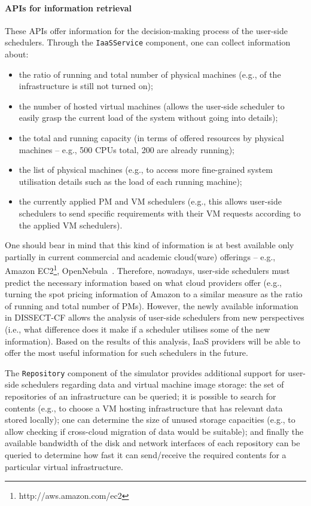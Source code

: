 \documentclass[sort, compress, 5p]{elsarticle}
\begin{document}
\paragraph{APIs for information retrieval} These APIs offer information for the decision-making process of the user-side schedulers. Through the \verb+IaaSService+ component, one can collect information about:
\begin{itemize}
\item the ratio of running and total number of physical machines (e.g.,  of the infrastructure is still not turned on);
\item the number of hosted virtual machines (allows the user-side scheduler to easily grasp the current load of the system without going into details);
\item the total and running capacity (in terms of offered resources by physical machines -- e.g.,  500 CPUs total, 200 are already running);
\item the list of physical machines (e.g., to access more fine-grained system utilisation details such as the load of each running machine);
\item the currently applied PM and VM schedulers (e.g., this allows user-side schedulers to send specific requirements with their VM requests according to the applied VM schedulers).
\end{itemize}
One should bear in mind that this kind of information is at best available only partially in current commercial and  academic cloud(ware) offerings -- e.g., Amazon EC2\footnote{http://aws.amazon.com/ec2}, OpenNebula~\cite{opennebula2011}. Therefore, nowadays, user-side schedulers must predict the necessary information based on what cloud providers offer (e.g., turning the spot pricing information of Amazon to a similar measure as the ratio of running and total number of PMs). However, the newly available information in DISSECT-CF allows the analysis of user-side schedulers from new perspectives (i.e., what difference does it make if a scheduler utilises some of the new information). Based on the results of this analysis, IaaS providers will be able to offer the most useful information for such schedulers in the future.

The \verb+Repository+ component of the simulator provides additional support for user-side schedulers regarding data and virtual machine image storage:  the set of repositories of an infrastructure can be queried;  it is possible to search for contents (e.g., to choose a VM hosting infrastructure that has relevant data stored locally);  one can determine the size of unused storage capacities (e.g., to allow checking if cross-cloud migration of data would be suitable); and finally  the available bandwidth of the disk and network interfaces of each repository can be queried to determine how fast it can send/receive the required contents for a particular virtual infrastructure.
\end{document}
